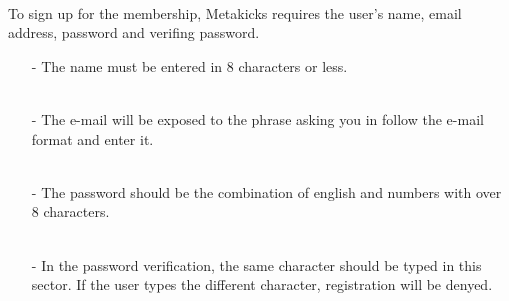 \documentclass[conference]{IEEEtran}
\begin{document}
\begin{enumerate}
\\To sign up for the membership, Metakicks requires the user's name, email address, password and verifing password.\\
	\begin{enumerate}
		\item[-]The name must be entered in 8 characters or less.\\\\
	\end{enumerate}
	\begin{enumerate}
		\item[-]The e-mail will be exposed to the phrase asking you in follow the e-mail format and enter it.\\\\
	\end{enumerate}
	\begin{enumerate}
		\item[-]The password should be the combination of english and numbers with over 8 characters.\\\\
	\end{enumerate}
	\begin{enumerate}
		\item[-]In the password verification, the same character should be typed in this sector. If the user types the different character, registration will be denyed.\\\\
	\end{enumerate}



\end{enumerate}
\end{document}
